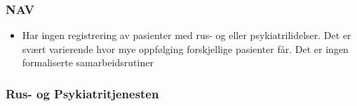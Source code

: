 \documentclass[11pt]{report} %
\begin{document}
                      \subsubsection{NAV}
                        \begin{itemize} 
                          \item Har ingen registrering av pasienter med rus- og eller psykiatrilidelser. Det er svært varierende hvor mye oppfølging forskjellige pasienter får. Det er ingen formaliserte samarbeidsrutiner
                        \end{itemize}
                      
                      \subsubsection{Rus- og Psykiatritjenesten}
                      	
\end{document}
